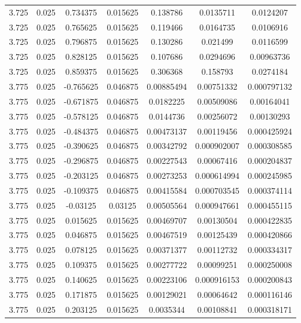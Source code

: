 \begin{table}[bh]
\begin{center}
{\begin{tabular}{ccccccc}
3.725	 & 0.025 & 	0.734375	 & 0.015625	 & 0.138786	 & 0.0135711	 & 0.0124207 \\ 
3.725	 & 0.025 & 	0.765625	 & 0.015625	 & 0.119466	 & 0.0164735	 & 0.0106916 \\ 
3.725	 & 0.025 & 	0.796875	 & 0.015625	 & 0.130286	 & 0.021499	 & 0.0116599 \\ 
3.725	 & 0.025 & 	0.828125	 & 0.015625	 & 0.107686	 & 0.0294696	 & 0.00963736 \\ 
3.725	 & 0.025 & 	0.859375	 & 0.015625	 & 0.306368	 & 0.158793	 & 0.0274184 \\ 
3.775	 & 0.025 & 	-0.765625	 & 0.046875	 & 0.00885494	 & 0.00751332	 & 0.000797132 \\ 
3.775	 & 0.025 & 	-0.671875	 & 0.046875	 & 0.0182225	 & 0.00509086	 & 0.00164041 \\ 
3.775	 & 0.025 & 	-0.578125	 & 0.046875	 & 0.0144736	 & 0.00256072	 & 0.00130293 \\ 
3.775	 & 0.025 & 	-0.484375	 & 0.046875	 & 0.00473137	 & 0.00119456	 & 0.000425924 \\ 
3.775	 & 0.025 & 	-0.390625	 & 0.046875	 & 0.00342792	 & 0.000902007	 & 0.000308585 \\ 
3.775	 & 0.025 & 	-0.296875	 & 0.046875	 & 0.00227543	 & 0.00067416	 & 0.000204837 \\ 
3.775	 & 0.025 & 	-0.203125	 & 0.046875	 & 0.00273253	 & 0.000614994	 & 0.000245985 \\ 
3.775	 & 0.025 & 	-0.109375	 & 0.046875	 & 0.00415584	 & 0.000703545	 & 0.000374114 \\ 
3.775	 & 0.025 & 	-0.03125	 & 0.03125	 & 0.00505564	 & 0.000947661	 & 0.000455115 \\ 
3.775	 & 0.025 & 	0.015625	 & 0.015625	 & 0.00469707	 & 0.00130504	 & 0.000422835 \\ 
3.775	 & 0.025 & 	0.046875	 & 0.015625	 & 0.00467519	 & 0.00125439	 & 0.000420866 \\ 
3.775	 & 0.025 & 	0.078125	 & 0.015625	 & 0.00371377	 & 0.00112732	 & 0.000334317 \\ 
3.775	 & 0.025 & 	0.109375	 & 0.015625	 & 0.00277722	 & 0.00099251	 & 0.000250008 \\ 
3.775	 & 0.025 & 	0.140625	 & 0.015625	 & 0.00223106	 & 0.000916153	 & 0.000200843 \\ 
3.775	 & 0.025 & 	0.171875	 & 0.015625	 & 0.00129021	 & 0.00064642	 & 0.000116146 \\ 
3.775	 & 0.025 & 	0.203125	 & 0.015625	 & 0.0035344	 & 0.00108841	 & 0.000318171 \\ 

\end{tabular}}
\end{center}
\end{table}
